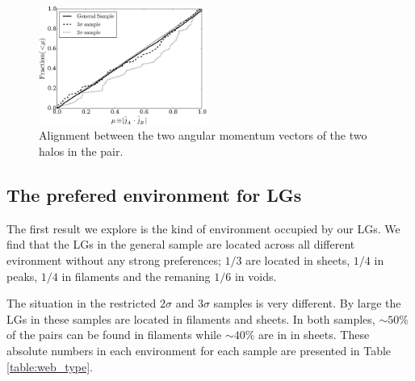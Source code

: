 \documentclass{emulateapj}
\begin{document}
\begin{figure}
\begin{center}
  \includegraphics[width=0.49\textwidth]{alignments_jj_all_environments.pdf}
\end{center}
\caption{Alignment between the two angular momentum vectors of the two
  halos in the pair.
    \label{fig:jj_alignment}}  
\end{figure}







\subsection{The prefered environment for LGs}

The first result we explore is the kind of environment occupied by
our LGs. We find that the LGs in the general sample are located across
all different evironment without any strong preferences; $1/3$  are
located in sheets, $1/4$ in peaks, $1/4$ in filaments and the remaning
$1/6$ in voids. 

The situation in the restricted $2\sigma$ and $3\sigma$ samples is very
different. By large the LGs in these samples are located in
filaments and sheets. In both samples, $\sim 50\%$ of the
pairs can be found in filaments while $\sim 40\%$ are in
in sheets. These absolute numbers in each environment for each sample
are presented in Table \ref{table:web_type}. 
\end{document}
